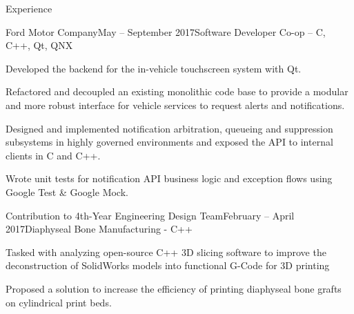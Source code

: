 \documentclass{resume} %
\begin{document}





\begin{rSection}{Experience}

\begin{rSubsection}{Ford Motor Company}{May -- September 2017}{Software Developer Co-op -- C, C++, Qt, QNX}{}

\item Developed the backend for the in-vehicle touchscreen system with Qt. 
\item Refactored and decoupled an existing monolithic code base to provide a modular and more robust interface for vehicle services to request alerts and notifications.
\item Designed and implemented notification arbitration, queueing and suppression subsystems in highly governed environments and exposed the API to internal clients in C and C++.
\item Wrote unit tests for notification API business logic and exception flows using Google Test \& Google Mock.

\end{rSubsection}

\begin{rSubsection}{Contribution to 4th-Year Engineering Design Team}{February -- April 2017}{Diaphyseal Bone Manufacturing - C++}{}
\item Tasked with analyzing open-source C++ 3D slicing software to improve the deconstruction of SolidWorks models into functional G-Code for 3D printing
\item Proposed a solution to increase the efficiency of printing diaphyseal bone grafts on cylindrical print beds.
\end{rSubsection}

\end{rSection}
\end{document}
